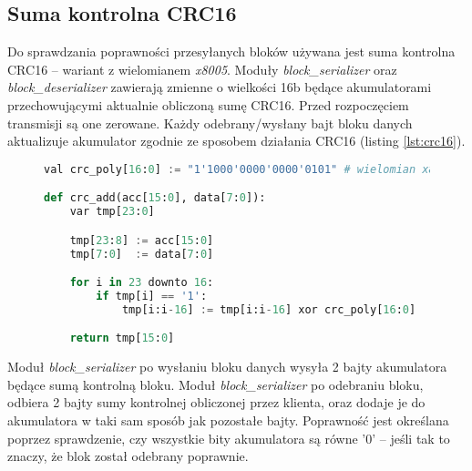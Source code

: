 \subsection{Suma kontrolna CRC16}
\label{sec:crc16}
Do sprawdzania poprawności przesyłanych bloków używana jest suma kontrolna CRC16 -- wariant z wielomianem \textit{x8005}. Moduły \textit{block\_serializer} oraz \textit{block\_deserializer} zawierają zmienne o wielkości 16b będące akumulatorami przechowującymi aktualnie obliczoną sumę CRC16. Przed rozpoczęciem transmisji są one zerowane. Każdy odebrany/wysłany bajt bloku danych aktualizuje akumulator zgodnie ze sposobem działania CRC16 (listing \ref{lst:crc16}). 

\begin{figure}[!h]
\begin{lstlisting}[language=Python, basicstyle=\ttfamily, autogobble=true, tabsize=3, morekeywords={downto, val, var}, captionpos=b, caption={Algorytm dodawania bajtu do akumulatora sumy kontrolnej CRC16}, label={lst:crc16}]
val crc_poly[16:0] := "1'1000'0000'0000'0101" # wielomian x8005

def crc_add(acc[15:0], data[7:0]):
	var tmp[23:0]

	tmp[23:8] := acc[15:0]
	tmp[7:0]  := data[7:0]

	for i in 23 downto 16:
		if tmp[i] == '1':
			tmp[i:i-16] := tmp[i:i-16] xor crc_poly[16:0]

	return tmp[15:0]
\end{lstlisting}
\end{figure}

Moduł \textit{block\_serializer} po wysłaniu bloku danych wysyła 2 bajty akumulatora będące sumą kontrolną bloku. Moduł \textit{block\_serializer} po odebraniu bloku, odbiera 2 bajty sumy kontrolnej obliczonej przez klienta, oraz dodaje je do akumulatora w taki sam sposób jak pozostałe bajty. Poprawność jest określana poprzez sprawdzenie, czy wszystkie bity akumulatora są równe {'0'} -- jeśli tak to znaczy, że blok został odebrany poprawnie.
